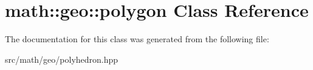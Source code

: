 \hypertarget{classmath_1_1geo_1_1polygon}{
\section{math::geo::polygon Class Reference}
\label{classmath_1_1geo_1_1polygon}
}


The documentation for this class was generated from the following file:\begin{DoxyCompactItemize}
\item 
src/math/geo/polyhedron.hpp\end{DoxyCompactItemize}
